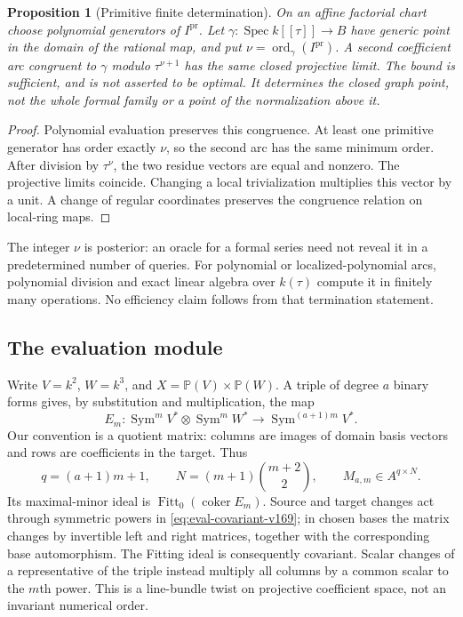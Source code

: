 \documentclass[11pt,reqno]{amsart}
\numberwithin{equation}{section}
\newtheorem{proposition}[theorem]{Proposition}
\theoremstyle{definition}\newtheorem{definition}[theorem]{Definition}
\theoremstyle{remark}\newtheorem{remark}[theorem]{Remark}
\newcommand{\Pj}{\mathbb P}\newcommand{\A}{\mathbb A}
\DeclareMathOperator{\Spec}{Spec}\DeclareMathOperator{\PGL}{PGL}
\begin{document}
\begin{proposition}[Primitive finite determination]\label{prop:primitive-jet-v169}
On an affine factorial chart choose polynomial generators of
$I^{\mathrm{pr}}$. Let $\gamma:\Spec k[[\tau]]\to B$ have generic
point in the domain of the rational map, and put
$\nu=\operatorname{ord}_\gamma(I^{\mathrm{pr}})$. A second coefficient
arc congruent to $\gamma$ modulo $\tau^{\nu+1}$ has the same closed
projective limit. The bound is sufficient, and is not asserted to be
optimal. It determines the closed graph point, not the whole formal
family or a point of the normalization above it.
\end{proposition}
\begin{proof}
Polynomial evaluation preserves this congruence. At least one primitive
generator has order exactly $\nu$, so the second arc has the same
minimum order. After division by $\tau^\nu$, the two residue vectors
are equal and nonzero. The projective limits coincide. Changing a local
trivialization multiplies this vector by a unit. A change of regular
coordinates preserves the congruence relation on local-ring maps.
\end{proof}
The integer $\nu$ is posterior: an oracle for a formal series need not
reveal it in a predetermined number of queries. For polynomial or
localized-polynomial arcs, polynomial division and exact linear algebra
over $k(\tau)$ compute it in finitely many operations. No efficiency
claim follows from that termination statement.

\subsection{The evaluation module}
Write $V=k^2$, $W=k^3$, and $X=\Pj(V)\times\Pj(W)$. A triple of degree
$a$ binary forms gives, by substitution and multiplication, the map
\begin{equation}\label{eq:eval-covariant-v169}
 E_m:\operatorname{Sym}^m V^*\otimes\operatorname{Sym}^m W^*
       \longrightarrow\operatorname{Sym}^{(a+1)m}V^*.
\end{equation}
Our convention is a quotient matrix: columns are images of domain basis
vectors and rows are coefficients in the target. Thus
\[
 q=(a+1)m+1,\qquad N=(m+1)\binom{m+2}{2},\qquad M_{a,m}\in A^{q\times N}.
\]
Its maximal-minor ideal is $\operatorname{Fitt}_0(\operatorname{coker}E_m)$.
Source and target changes act through symmetric powers in
\eqref{eq:eval-covariant-v169}; in chosen bases the matrix changes by
invertible left and right matrices, together with the corresponding
base automorphism. The Fitting ideal is consequently covariant. Scalar
changes of a representative of the triple instead multiply all columns
by a common scalar to the $m$th power. This is a line-bundle twist on
projective coefficient space, not an invariant numerical order.
\end{document}
